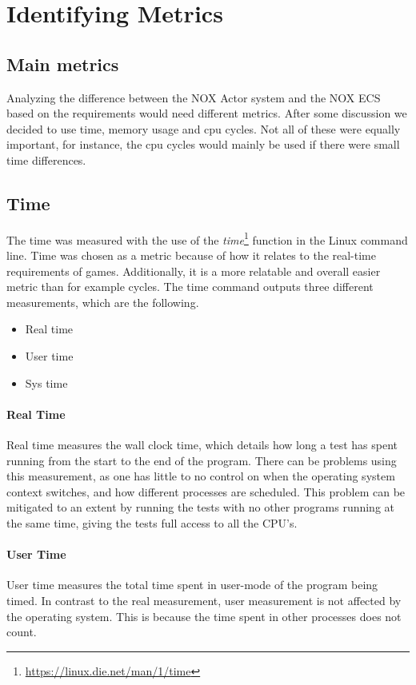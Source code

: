 \section{Identifying Metrics}

\subsection{Main metrics}
Analyzing the difference between the NOX Actor system and the NOX ECS based on the requirements would need different metrics.
After some discussion we decided to use time, memory usage and cpu cycles.
Not all of these were equally important, for instance, the cpu cycles would mainly be used if there were small time differences.

\subsection{Time}
The time was measured with the use of the \emph{time}\footnote{\url{https://linux.die.net/man/1/time}} function in the Linux command line.
Time was chosen as a metric because of how it relates to the real-time requirements of games.
Additionally, it is a more relatable and overall easier metric than for example cycles.
The time command outputs three different measurements, which are the following\cite{stack_overflow_time_output}.

\begin{itemize}
    \item Real time
    \item User time
    \item Sys time
\end{itemize}

\paragraph{Real Time}
Real time measures the wall clock time, which details how long a test has spent running from the start to the end of the program.
There can be problems using this measurement, as one has little to no control on when the operating system context switches, and how different processes are scheduled.
This problem can be mitigated to an extent by running the tests with no other programs running at the same time, giving the tests full access to all the CPU's.

\paragraph{User Time}
User time measures the total time spent in user-mode of the program being timed.
In contrast to the real measurement, user measurement is not affected by the operating system.
This is because the time spent in other processes does not count.

